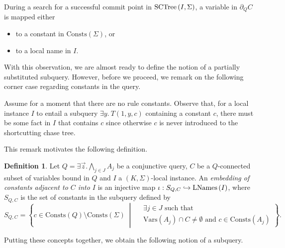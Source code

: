 \documentclass[12pt]{report}
\theoremstyle{plain}
\theoremstyle{definition}
\newtheorem{definition}[theorem]{Definition}
\def\Vars{{\mathrm{Vars}}}
\def\Consts{{\mathrm{Consts}}}
\newcommand{\SCTree}[2]{\ensuremath{\normalfont{\textrm{SCTree}} \left( #1, #2 \right)}}
\newcommand{\LNames}[1]{\ensuremath{\normalfont{\textrm{LNames}} \left( #1 \right)}}
\begin{document}
During a search for a successful commit point in $\SCTree{I}{\Sigma}$, a variable in $\partial_Q C$ is mapped either
\begin{itemize}
  \item to a constant in $\Consts(\Sigma)$, or
  \item to a local name in $I$.
\end{itemize}

With this observation, we are almost ready to define the notion of a partially substituted subquery. However, before we proceed, we remark on the following corner case regarding constants in the query.

Assume for a moment that there are no rule constants. Observe that, for a local instance $I$ to entail a subquery $\exists y.\ T(1, y, c)$ containing a constant $c$, there must be some fact in $I$ that contains $c$ since otherwise $c$ is never introduced to the shortcutting chase tree.

This remark motivates the following definition.

\begin{definition}
\label{definition:embedding-of-constants-adjacent-to-c}
  Let $Q = \exists \vec{z}. \bigwedge_{j \in J} A_j$ be a conjunctive query, $C$ be a $Q$-connected subset of variables bound in $Q$ and $I$ a $(K, \Sigma)$-local instance. An \emph{embedding of constants adjacent to $C$ into $I$} is an injective map $\iota: S_{Q, C} \hookrightarrow \LNames{I}$, where $S_{Q, C}$ is the set of constants in the subquery defined by $$
  S_{Q, C} = \left\{
      c \in \Consts(Q) \setminus \Consts(\Sigma)
        \;\middle|\;
      \begin{aligned}
        & \exists j \in J \text{ such that } \\
        & \Vars(A_j) \cap C \neq \emptyset \text{ and } c \in \Consts(A_j)
      \end{aligned}
    \right\}.
  $$
\end{definition}

Putting these concepts together, we obtain the following notion of a subquery.
\end{document}
